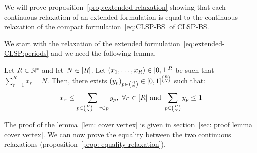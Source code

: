 We will prove proposition~\ref{prop:extended-relaxation} showing that each continuous relaxation of an extended formulation is equal to the continuous relaxation of the compact formulation~\eqref{eq:CLSP-BS} of CLSP-BS.


We start with the relaxation of the extended formulation~\eqref{eq:extended-CLSP:periods} and we need the following lemma.

\begin{lem}\label{lem:cover-vertex}
Let $R\in\mathbb{N}^*$ and let $N\in\range{R}$. Let $\bracket{x_1,\ldots,x_R}\in\sqbracket{0,1}^R$ be such that $\sum_{r=1}^Rx_r = N$.
Then, there exists $\bracket{y_p}_{p\in{R\choose N}}\in\sqbracket{0,1}^{R\choose N}$ such that:
$$x_r \le \sum_{p\in{R\choose N}~|~r\in p}y_p,\ \forall r\in\range{R} \mbox{ and } \sum_{p\in{R\choose N}}y_p \le 1$$
\end{lem}

The proof of the lemma~\ref{lem: cover vertex} is given in section~\ref{sec: proof lemma cover vertex}. We can now prove the equality between the two continuous relaxations (proposition~\ref{prop: equality relaxation}).



